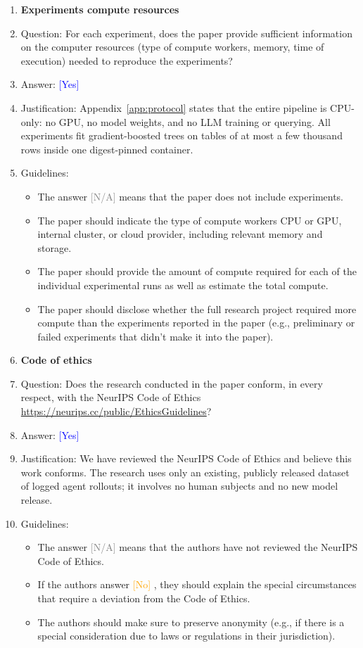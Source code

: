 \documentclass{article}
\providecommand{\answerYes}[1][]{\textcolor{blue}{[Yes] #1}}
\providecommand{\answerNo}[1][]{\textcolor{orange}{[No] #1}}
\providecommand{\answerNA}[1][]{\textcolor{gray}{[N/A] #1}}
\begin{document}
\begin{enumerate}
\item {\bf Experiments compute resources}
    \item[] Question: For each experiment, does the paper provide sufficient information on the computer resources (type of compute workers, memory, time of execution) needed to reproduce the experiments?
    \item[] Answer: \answerYes{}
    \item[] Justification: Appendix~\ref{app:protocol} states that the entire pipeline is CPU-only: no GPU, no model weights, and no LLM training or querying. All experiments fit gradient-boosted trees on tables of at most a few thousand rows inside one digest-pinned container.
    \item[] Guidelines:
    \begin{itemize}
        \item The answer \answerNA{} means that the paper does not include experiments.
        \item The paper should indicate the type of compute workers CPU or GPU, internal cluster, or cloud provider, including relevant memory and storage.
        \item The paper should provide the amount of compute required for each of the individual experimental runs as well as estimate the total compute.
        \item The paper should disclose whether the full research project required more compute than the experiments reported in the paper (e.g., preliminary or failed experiments that didn't make it into the paper).
    \end{itemize}

\item {\bf Code of ethics}
    \item[] Question: Does the research conducted in the paper conform, in every respect, with the NeurIPS Code of Ethics \url{https://neurips.cc/public/EthicsGuidelines}?
    \item[] Answer: \answerYes{}
    \item[] Justification: We have reviewed the NeurIPS Code of Ethics and believe this work conforms. The research uses only an existing, publicly released dataset of logged agent rollouts; it involves no human subjects and no new model release.
    \item[] Guidelines:
    \begin{itemize}
        \item The answer \answerNA{} means that the authors have not reviewed the NeurIPS Code of Ethics.
        \item If the authors answer \answerNo, they should explain the special circumstances that require a deviation from the Code of Ethics.
        \item The authors should make sure to preserve anonymity (e.g., if there is a special consideration due to laws or regulations in their jurisdiction).
    \end{itemize}


\end{enumerate}
\end{document}

